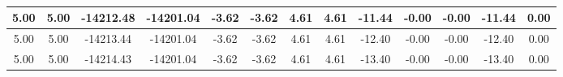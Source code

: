 \begin{table}[htbp]
\begin{adjustbox}{angle=90}
\begin{tabular}{|c|c|c|c|c|c|c|c|c|c|c|c|c|}
 5.00 & 5.00 & -14212.48 & -14201.04 & -3.62 & -3.62 & 4.61 & 4.61 & -11.44 & -0.00 & -0.00 & -11.44 & 0.00\\ \hline
 5.00 & 5.00 & -14213.44 & -14201.04 & -3.62 & -3.62 & 4.61 & 4.61 & -12.40 & -0.00 & -0.00 & -12.40 & 0.00\\ \hline
 5.00 & 5.00 & -14214.43 & -14201.04 & -3.62 & -3.62 & 4.61 & 4.61 & -13.40 & -0.00 & -0.00 & -13.40 & 0.00\\ \hline
            \end{tabular}
        \end{adjustbox}
        \caption{}
        \label{}
    \end{table}
    